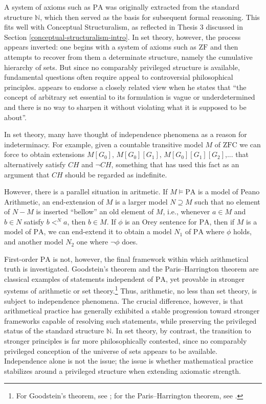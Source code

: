 \documentclass[11pt,a4paper]{article}
\theoremstyle{plain}
\begin{document}
A system of axioms such as \(\mathrm{PA}\) was originally extracted from the standard structure \(\mathbb{N}\), which then served as the basis for subsequent formal reasoning. This fits well with Conceptual Structuralism, as reflected in Thesis 3 discussed in Section \ref{conceptual-structuralism-intro}. In set theory, however, the process appears inverted: one begins with a system of axioms such as \(\mathrm{ZF}\) and then attempts to recover from them a determinate structure, namely the cumulative hierarchy of sets. But since no comparably privileged structure is available, fundamental questions often require appeal to controversial philosophical principles. \textcite[p.~1]{Feferman2011a} appears to endorse a closely related view when he states that ``the concept of arbitrary set essential to its formulation is vague or underdetermined and there is no way to sharpen it without violating what it is supposed to be about''.

In set theory, many have thought of independence phenomena as a reason for indeterminacy. For example, given a countable transitive model $M$ of $\mathrm{ZFC}$ we can force to obtain extensions $M[G_0]$, $M[G_0][G_1]$, $M[G_0][G_1][G_2]$,... that alternatively satisfy $CH$ and $\neg CH$, something that \textcite{Hamkins2012Multiverse} has used this fact as an argument that $CH$ should be regarded as indefinite. 

However, there is \textcite[513]{Koellner2016} a parallel situation in aritmetic. If $M \models \mathrm{PA}$ is a model of Peano Arithmetic, an end-extension of $M$ is a larger model $N \supseteq M$ such that no element of $N - M$ is inserted ``bellow'' an old element of $M$, i.e., whenever $a \in M$ and $b \in N$ satisfy $b <^N a $, then $b \in M$. If $\phi$ is an Orey sentence for $\mathrm{PA}$, then if $M$ is a model of $\mathrm{PA}$, we can end-extend it to obtain a model $N_1$ of $\mathrm{PA}$ where $\phi $ holds, and another model $N_2$ one where $\neg \phi$ does. 

First-order \(\mathrm{PA}\) is not, however, the final framework within which arithmetical truth is investigated. Goodstein's theorem and the Paris--Harrington theorem are classical examples of statements independent of \(\mathrm{PA}\), yet provable in stronger systems of arithmetic or set theory.\footnote{For Goodstein's theorem, see \textcite{KirbyParis1982}; for the Paris--Harrington theorem, see \textcite{ParisHarrington1977}.} Thus, arithmetic, no less than set theory, is subject to independence phenomena. The crucial difference, however, is that arithmetical practice has generally exhibited a stable progression toward stronger frameworks capable of resolving such statements, while preserving the privileged status of the standard structure \(\mathbb{N}\). In set theory, by contrast, the transition to stronger principles is far more philosophically contested, since no comparably privileged conception of the universe of sets appears to be available. Independence alone is not the issue; the issue is whether mathematical practice stabilizes around a privileged structure when extending axiomatic strength.
\end{document}
